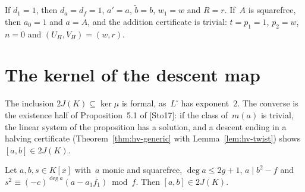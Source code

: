 If $d_1 = 1$, then $d_a = d_f = 1$, $a' = a$, $\tilde b = b$, $w_1 = w$ and $R = r$. If~$A$ is
squarefree, then $a_0 = 1$ and $a = A$, and the addition certificate is trivial: $t = p_1 = 1$,
$p_2 = w$, $n = 0$ and $(U_H, V_H) = (w, r)$.

\section{The kernel of the descent map}
\label{sec:ds-kernel}

The inclusion $2J(K) \subseteq \ker\mu$ is formal, as~$L^\square$ has exponent~$2$. The converse
is the existence half of Proposition~5.1 of [Sto17]: if the class of~$m(a)$ is trivial, the linear
system of the proposition has a solution, and a descent ending in a halving certificate
(Theorem~\ref{thm:hv-generic} with Lemma~\ref{lem:hv-twist}) shows $[a, b] \in 2J(K)$.

\begin{theorem}
\label{thm:ds-halving-exists}
\leanok
{}
Let $a, b, s \in K[x]$ with~$a$ monic and squarefree, $\deg a \le 2g + 1$, $a \mid b^2 - f$ and
$s^2 \equiv (-c)^{\deg a}(a - a_1f_1) \bmod f$. Then $[a, b] \in 2J(K)$.
\end{theorem}

